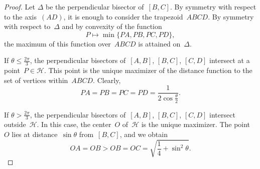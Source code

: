 \documentclass[11pt,reqno]{amsart}
\theoremstyle{definition}
\numberwithin{equation}{section}
\numberwithin{equation}{section}
\begin{document}
\begin{proof}
Let $\Delta$ be the perpendicular bisector of~$[B,C]$.
By symmetry with respect to the axis~$(AD)$, it is enough to consider the trapezoid~$ABCD$.
By symmetry with respect to~$\Delta$ and by convexity of the function
\[
P \longmapsto \min\{PA,PB,PC,PD\},
\]
the maximum of this function over~$ABCD$ is attained on~$\Delta$.

If $\theta \leq \frac{2\pi}{3}$, the perpendicular bisectors of~$[A,B]$, $[B,C]$, $[C,D]$ intersect at a point~$P \in \mathcal{H}$.
This point is the unique maximizer of the distance function to the set of vertices within~$ABCD$.
Clearly,
\[
PA=PB=PC=PD= \frac{1}{2 \cos \frac{\theta}{2}}.
\]

If $\theta > \frac{2\pi}{3}$, the perpendicular bisectors of~$[A,B]$, $[B,C]$, $[C,D]$ intersect outside~$\mathcal{H}$.
In this case, the center~$O$ of~$\mathcal{H}$ is the unique maximizer.
The point~$O$ lies at distance~$\sin \theta$ from~$[B,C]$, and we obtain
\[
OA = OB > OB=OC = \sqrt{\frac{1}{4} + \sin^2 \theta}.
\]
\end{proof}
\end{document}
